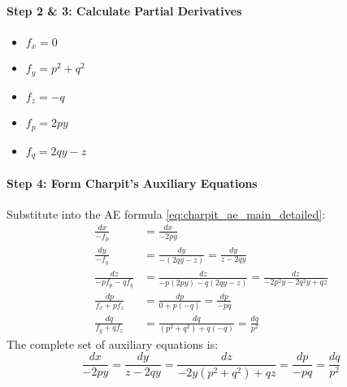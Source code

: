 \documentclass{article}
\theoremstyle{remark}
\begin{document}
	\paragraph{Step 2 \& 3: Calculate Partial Derivatives}
	\begin{itemize}
		\item $f_x = 0$
		\item $f_y = p^2 + q^2$
		\item $f_z = -q$
		\item $f_p = 2py$
		\item $f_q = 2qy - z$
	\end{itemize}
	
	\paragraph{Step 4: Form Charpit's Auxiliary Equations}
	Substitute into the AE formula \eqref{eq:charpit_ae_main_detailed}:
	\begin{align*}
		\frac{dx}{-f_p} &= \frac{dx}{-2py} \\
		\frac{dy}{-f_q} &= \frac{dy}{-(2qy - z)} = \frac{dy}{z - 2qy} \\
		\frac{dz}{-p f_p - q f_q} &= \frac{dz}{-p(2py) - q(2qy - z)} = \frac{dz}{-2p^2y - 2q^2y + qz} \\
		\frac{dp}{f_x + p f_z} &= \frac{dp}{0 + p(-q)} = \frac{dp}{-pq} \\
		\frac{dq}{f_y + q f_z} &= \frac{dq}{(p^2 + q^2) + q(-q)} = \frac{dq}{p^2}
	\end{align*}
	The complete set of auxiliary equations is:
	\begin{equation} \label{eq:charpit_ae_final_ex_charpit_example}
		\frac{dx}{-2py} = \frac{dy}{z - 2qy} = \frac{dz}{-2y(p^2+q^2) + qz} = \frac{dp}{-pq} = \frac{dq}{p^2}
	\end{equation}
	
\end{document}
